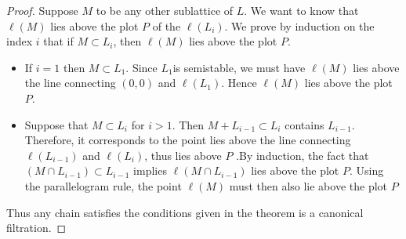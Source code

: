 \begin{proof}
    Suppose $M$ to be any other sublattice of $L$. We want to know that $\ell(M)$ lies
    above the plot $P$ of the $\ell(L_i)$. We prove by induction on the index $i$ that if $M \subset L_i$, then $\ell(M)$ lies above the
    plot $P$.
    \begin{itemize}
        \item If $i=1$ then $M\subset L_1$. Since $L_1 $is semistable, we must have $\ell(M)$ lies above the line connecting $(0,0)$ and $\ell(L_1)$. Hence $\ell(M)$ lies above the plot $P$.
        \item Suppose that $M\subset L_i$ for $i>1$. Then $M+L_{i-1} \subset L_i$ contains $L_{i-1}$. Therefore, it corresponds to the point lies above the line connecting $\ell(L_{i-1})$ and $\ell(L_i)$, thus lies above $P$
              .By induction, the fact that $(M\cap L_{i-1}) \subset L_{i-1}$ implies $\ell(M\cap L_{i-1})$ lies above the plot $P$.
              Using the parallelogram rule, the point $\ell(M)$ must then also lie above the plot $P$
    \end{itemize}
    Thus any chain satisfies the conditions given in the theorem is a canonical filtration.
\end{proof}
